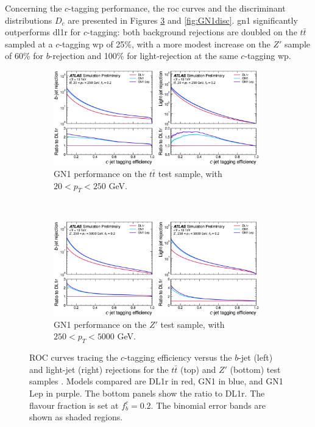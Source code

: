 Concerning the $c$-tagging performance, the \gls{roc} curves and the discriminant distributions $D_c$ are presented in Figures \ref{fig:GN1rocc} and \ref{fig:GN1disc}. \gls{gn1} significantly outperforms \gls{dl1r} for $c$-tagging: both background rejections are doubled on the $t\bar{t}$ sampled at a $c$-tagging \gls{wp} of 25\%, with a more modest increase on the $Z'$ sample of 60\% for $b$-rejection and 100\% for light-rejection at the same $c$-tagging \gls{wp}. \\

\begin{figure}[h!]
  \centering
  \begin{subfigure}[b]{0.98\textwidth}
      \centering
      \includegraphics[width=0.98\textwidth]{Images/FTAG/GN/GN1/ROC/ttc.png}
      \caption{GN1 performance on the $t\bar{t}$ test sample, with $20 < p_T < 250$ GeV.} 
      \label{fig:GN1ttc}
  \end{subfigure}\\
  \begin{subfigure}[b]{0.98\textwidth}
    \centering
      \includegraphics[width=0.98\textwidth]{Images/FTAG/GN/GN1/ROC/zpc.png}
      \caption{GN1 performance on the $Z'$ test sample, with $250 < p_T < 5000$ GeV.} 
      \label{fig:GN1zpc}
  \end{subfigure}
  \caption{ROC curves tracing the $c$-tagging efficiency versus the $b$-jet (left) and light-jet (right) rejections for the $t\bar{t}$ (top) and $Z'$ (bottom) test samples \cite{ATL-PHYS-PUB-2022-027}. Models compared are DL1r in red, GN1 in blue, and GN1 Lep in purple. The bottom panels show the ratio to DL1r. The flavour fraction is set at $f^c_b = 0.2$. The binomial error bands are shown as shaded regions.}
  \label{fig:GN1rocc}
\end{figure} 


